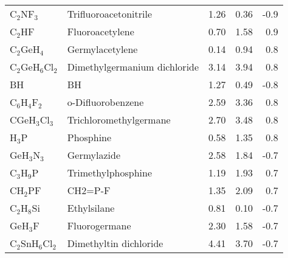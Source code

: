 \begin{table}
\begin{center}
\begin{tabular}{llrrr}
 C$_2$NF$_3$          & Trifluoroacetonitrile                  &    1.26   &     0.36   &   -0.9\\
 C$_2$HF              & Fluoroacetylene                        &    0.70   &     1.58   &    0.9\\
 C$_2$GeH$_4$         & Germylacetylene                        &    0.14   &     0.94   &    0.8\\
 C$_2$GeH$_6$Cl$_2$   & Dimethylgermanium dichloride           &    3.14   &     3.94   &    0.8\\
 BH                   & BH                                     &    1.27   &     0.49   &   -0.8\\
 C$_6$H$_4$F$_2$      & o-Difluorobenzene                      &    2.59   &     3.36   &    0.8\\
 CGeH$_3$Cl$_3$       & Trichloromethylgermane                 &    2.70   &     3.48   &    0.8\\
 H$_3$P               & Phosphine                              &    0.58   &     1.35   &    0.8\\
 GeH$_3$N$_3$         & Germylazide                            &    2.58   &     1.84   &   -0.7\\
 C$_3$H$_9$P          & Trimethylphosphine                     &    1.19   &     1.93   &    0.7\\
 CH$_2$PF             & CH2=P-F                                &    1.35   &     2.09   &    0.7\\
 C$_2$H$_8$Si         & Ethylsilane                            &    0.81   &     0.10   &   -0.7\\
 GeH$_3$F             & Fluorogermane                          &    2.30   &     1.58   &   -0.7\\
 C$_2$SnH$_6$Cl$_2$   & Dimethyltin dichloride                 &    4.41   &     3.70   &   -0.7\\
\end{tabular}
\end{center}
\end{table}
